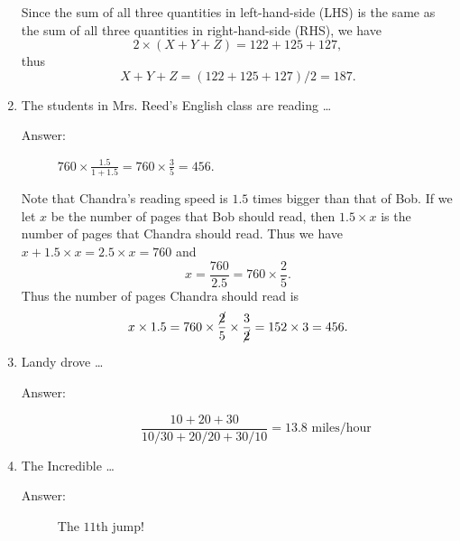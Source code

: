 \documentclass{article}
\begin{document}
\begin{enumerate}
\begin{solution}
Since the sum of all three quantities in left-hand-side (LHS)
is the same as the sum of all three quantities in right-hand-side (RHS),
we have
\begin{equation}
2 \times ( X + Y + Z ) = 122+125+127,
\end{equation}
thus
\begin{equation}
X + Y + Z = (122+125+127)/2 = 187.
\end{equation}

\end{solution}


\item The students in Mrs. Reed's English class are reading \ldots

\begin{description}
\item[Answer:] $760 \times \frac{1.5}{1 + 1.5} = 760 \times \frac{3}{5}= 456.$
\end{description}

\begin{solution}
Note that Chandra's reading speed is $1.5$ times bigger than that of Bob.
If we let $x$ be the number of pages that Bob should read,
then $1.5 \times x$ is the number of pages that Chandra should read.
Thus we have $x + 1.5 \times x = 2.5 \times x = 760$ and
\begin{equation}
x = \frac{760}{2.5} = 760 \times \frac{2}{5}.
\end{equation}
Thus the number of pages Chandra should read is
\begin{equation}
x \times 1.5 = 760 \times \frac{\cancel{2}}{5} \times \frac{3}{\cancel{2}}
= 152 \times 3 = 456.
\end{equation}
\end{solution}


\item Landy drove \ldots\\

\begin{description}
\item[Answer:]
\begin{equation}
\frac{10+20+30}{10/30 + 20/20 + 30/10} = 13.8 \mbox{ miles/hour}
\end{equation}
\end{description}


\item The Incredible \ldots\\

\begin{description}
\item[Answer:] The $11$th jump!
\end{description}


\end{enumerate}
\end{document}
